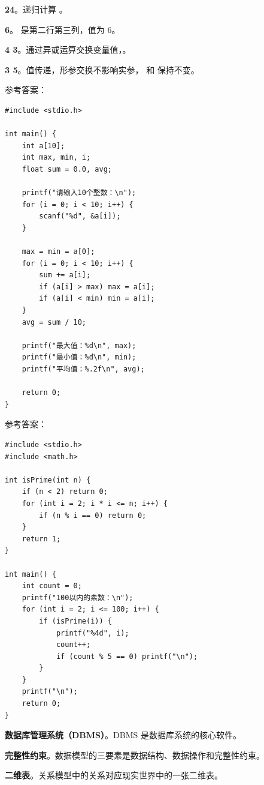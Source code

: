 \documentclass[a4paper,11pt]{article}
\begin{document}
\q \textbf{24}。递归计算 。

\q \textbf{6}。 是第二行第三列，值为 6。

\q \textbf{4 3}。通过异或运算交换变量值，。

\q \textbf{3 5}。值传递，形参交换不影响实参， 和  保持不变。


\pq 参考答案：
\begin{lstlisting}[language={[custom]C}]
#include <stdio.h>

int main() {
    int a[10];
    int max, min, i;
    float sum = 0.0, avg;

    printf("请输入10个整数：\n");
    for (i = 0; i < 10; i++) {
        scanf("%d", &a[i]);
    }

    max = min = a[0];
    for (i = 0; i < 10; i++) {
        sum += a[i];
        if (a[i] > max) max = a[i];
        if (a[i] < min) min = a[i];
    }
    avg = sum / 10;

    printf("最大值：%d\n", max);
    printf("最小值：%d\n", min);
    printf("平均值：%.2f\n", avg);

    return 0;
}
\end{lstlisting}

\pq 参考答案：
\begin{lstlisting}[language={[custom]C}]
#include <stdio.h>
#include <math.h>

int isPrime(int n) {
    if (n < 2) return 0;
    for (int i = 2; i * i <= n; i++) {
        if (n % i == 0) return 0;
    }
    return 1;
}

int main() {
    int count = 0;
    printf("100以内的素数：\n");
    for (int i = 2; i <= 100; i++) {
        if (isPrime(i)) {
            printf("%4d", i);
            count++;
            if (count % 5 == 0) printf("\n");
        }
    }
    printf("\n");
    return 0;
}
\end{lstlisting}



\q \textbf{数据库管理系统（DBMS）}。DBMS 是数据库系统的核心软件。

\q \textbf{完整性约束}。数据模型的三要素是数据结构、数据操作和完整性约束。

\q \textbf{二维表}。关系模型中的关系对应现实世界中的一张二维表。
\end{document}
